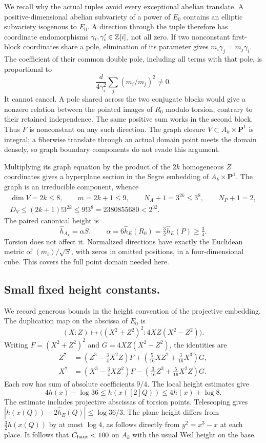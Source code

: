 We recall why the actual tuples avoid every exceptional abelian
translate. A positive-dimensional abelian subvariety of a power of
$E_0$ contains an elliptic subvariety isogenous to $E_0$. A direction
through the tuple therefore has coordinate endomorphisms
$\gamma_i,\gamma_i'\in\mathbb Z[i]$, not all zero. If two nonconstant
first-block coordinates share a pole, elimination of its parameter gives
$m_i\gamma_j=m_j\gamma_i$. The coefficient of their common double pole,
including all terms with that pole, is proportional to
\[
 \frac d{4\gamma_i^2}\sum_j(m_i/m_j)^2\ne0.
\]
It cannot cancel. A pole shared across the two conjugate blocks would
give a nonzero relation between the pointed images of $R_0$ modulo
torsion, contrary to their retained independence. The same positive
sum works in the second block. Thus $F$ is nonconstant on any such
direction. The graph closure $V\subset A_k\times\mathbf P^1$ is
integral; a fiberwise translate through an actual domain point meets
the domain densely, so graph boundary components do not evade this
argument.

Multiplying its graph equation by the product of the $2k$ homogeneous
$Z$ coordinates gives a hyperplane section in the Segre embedding of
$A_k\times\mathbf P^1$. The graph is an irreducible component, whence
\begin{gather*}
 \dim V=2k\le8,\qquad m=2k+1\le9,
 \qquad N_A+1=3^{2k}\le3^8,\qquad N_P+1=2,\\
 D_V\le(2k+1)!3^{2k}\le9!3^8=2380855680<2^{32}.
\end{gather*}
The paired canonical height is
\[
 \widehat h_{A_k}=\alpha S,\qquad
 \alpha=6\widehat h_E(R_0)=\tfrac32\widehat h_E(P)\ge\tfrac34.
\]
Torsion does not affect it. Normalized directions have exactly the
Euclidean metric of $(m_i)/\sqrt S$, with zeros in omitted positions,
in a four-dimensional cube. This covers the full point domain needed here.


\subsection{Small fixed height constants.}
We record generous bounds in the height convention of the projective
embedding. The duplication map on the abscissa of $E_0$ is
\[
 (X:Z)\longmapsto\big((X^2+Z^2)^2:4XZ(X^2-Z^2)\big).
\]
Writing $F=(X^2+Z^2)^2$ and $G=4XZ(X^2-Z^2)$, the identities are
\[
\begin{aligned}
 Z^7&=(Z^3-\tfrac34X^2Z)F
              +(\tfrac5{16}XZ^2+\tfrac3{16}X^3)G,\\
 X^7&=(X^3-\tfrac34XZ^2)F
              -(\tfrac3{16}Z^3+\tfrac5{16}X^2Z)G.
\end{aligned}
\]
Each row has sum of absolute coefficients $9/4$. The local height estimates give
\[
 4h(x)-\log36\le h(x([2]Q))\le4h(x)+\log8.
\]
The estimate includes projective abscissas of torsion points. Telescoping
gives $|h(x(Q))-2\widehat h_E(Q)|\le\log36/3$.
The plane height differs from $\tfrac32h(x(Q))$ by at most $\log4$,
as follows directly from $y^2=x^3-x$ at each place. It follows that
$C_{\rm haut}<100$ on $A_k$ with the usual Weil height on the base.

